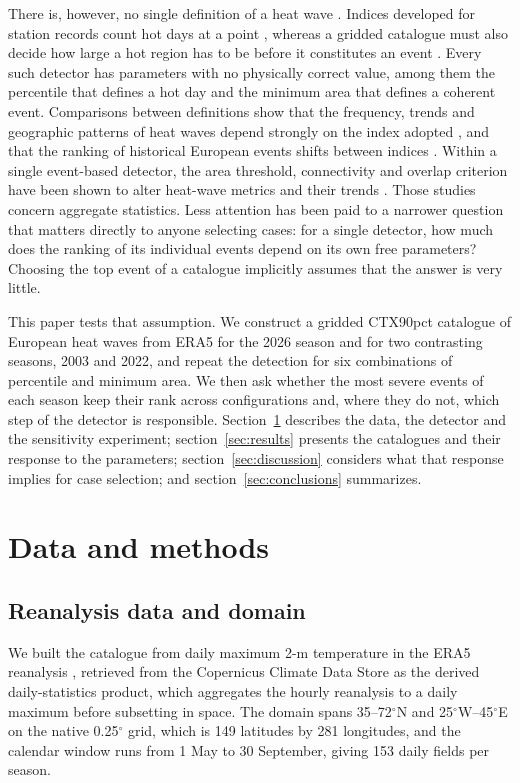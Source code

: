 \documentclass{amsdraft}
\begin{document}
There is, however, no single definition of a heat wave
\citep{PerkinsAlexander2013,Perkins2015}. Indices developed for station
records count hot days at a point \citep{Zhang2011}, whereas a gridded
catalogue must also decide how large a hot region has to be before it
constitutes an event \citep{Stefanon2012,Lhotka2015}. Every such detector has
parameters with no physically correct value, among them the percentile that
defines a hot day and the minimum area that defines a coherent event.
Comparisons between definitions show that the frequency, trends and
geographic patterns of heat waves depend strongly on the index adopted
\citep{Smith2013}, and that the ranking of historical European events shifts
between indices \citep{Becker2022}. Within a single event-based detector,
the area threshold, connectivity and overlap criterion have been shown to
alter heat-wave metrics and their trends \citep{Zhang2025}. Those studies
concern aggregate statistics. Less attention has been paid to a narrower
question that matters directly to anyone selecting cases: for a single
detector, how much does the ranking of its individual events depend on its
own free parameters? Choosing the top event of a catalogue implicitly assumes
that the answer is very little.

This paper tests that assumption. We construct a gridded CTX90pct catalogue
of European heat waves from ERA5 for the 2026 season and for two contrasting
seasons, 2003 and 2022, and repeat the detection for six combinations of
percentile and minimum area. We then ask whether the most severe events of
each season keep their rank across configurations and, where they do not,
which step of the detector is responsible. Section~\ref{sec:methods} describes
the data, the detector and the sensitivity experiment;
section~\ref{sec:results} presents the catalogues and their response to the
parameters; section~\ref{sec:discussion} considers what that response implies
for case selection; and section~\ref{sec:conclusions} summarizes.

\section{Data and methods}
\label{sec:methods}

\subsection{Reanalysis data and domain}
\label{sec:data}

We built the catalogue from daily maximum 2-m temperature in the ERA5
reanalysis \citep{Hersbach2020}, retrieved from the Copernicus Climate Data
Store as the derived daily-statistics product, which aggregates the hourly
reanalysis to a daily maximum before subsetting in space. The domain spans
35--72$^\circ$N and 25$^\circ$W--45$^\circ$E on the native 0.25$^\circ$ grid,
which is 149 latitudes by 281 longitudes, and the calendar window runs from 1
May to 30 September, giving 153 daily fields per season.
\end{document}
